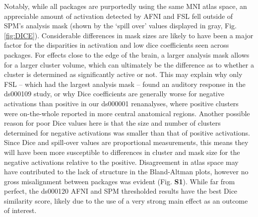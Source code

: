 Notably, while all packages are purportedly using the same MNI atlas space, an appreciable amount of activation detected by AFNI and FSL fell outside of SPM's analysis mask (shown by the `spill over' values displayed in gray, Fig. \ref{fig:DICE}). Considerable differences in mask sizes are likely to have been a major factor for the disparities in activation and low dice coefficients seen across packages. For effects close to the edge of the brain, a larger analysis mask allows for a larger cluster volume, which can ultimately be the difference as to whether a cluster is determined as significantly active or not. This may explain why only FSL -- which had the largest analysis mask -- found an auditory response in the ds000109 study, or why Dice coefficients are generally worse for negative activations than positive in our ds000001 renanalyses, where positive clusters were on-the-whole reported in more central anatomical regions. Another possible reason for poor Dice values here is that the size and number of clusters determined for negative activations was smaller than that of positive activations. Since Dice and spill-over values are proportional measurements, this means they will have been more susceptible to differences in cluster and mask size for the negative activations relative to the positive. Disagreement in atlas space may have contributed to the lack of structure in the Bland-Altman plots, however no gross misalignment between packages was evident (Fig. \textbf{S1}). While far from perfect, the ds000120 AFNI and SPM thresholded results have the best Dice similarity score, likely due to the use of a very strong main effect as an outcome of interest.

